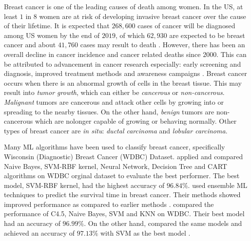 \noindent Breast cancer is one of the leading causes of death among women. In the US, at least $1$ in $8$ women are at risk of developing invasive breast cancer over the cause of their lifetime. It is expected that $268,600$ cases of cancer will be diagnosed among US women by the end of $2019$, of which $62,930$ are expected to be breast cancer and about $41,760$ cases may result to death \citep{uscancer2019}. However, there has been an overall decline in cancer incidence and cancer related deaths since $2000$. This can be attributed to advancement in cancer research especially: early screening and diagnosis, improved treatment methods and awareness campaigns \citep{asri2016using}. Breast cancer occurs when there is an abnormal growth of cells in the breast tissue. This may result into \textit{tumor growth}, which can either be \textit{cancerous} or \textit{non-cancerous}. \textit{Malignant} tumors are cancerous and attack other cells by growing into or spreading to the nearby tissues. On the other hand, \textit{benign} tumors are non-cancerous which are nolonger capable of growing or behaving normally. Other types of breast cancer are \textit{in situ}: \textit{ductal carcinoma} and \textit{lobular carcinoma}.\\

\noindent Many ML algorithms have been used to classify breast cancer, specifically Wisconsin (Diagnostic) Breast Cancer (WDBC) Dataset. \citet{chaurasia2017data} applied and compared Naive Bayes, SVM-RBF kernel, Neural Network, Decision Tree and CART algorithms on WDBC orginal dataset to evaluate the best performer. The best model, SVM-RBF kernel, had the highest accuracy of $96.84\%$. \citet{djebbari2008ensemble} used ensemble ML techniques to predict the survival time in breast cancer. Their methods showed improved performance as compared to earlier methods \citep{asri2016using}. \citet{aruna2011knowledge} compared the performance of C4.5, Naive Bayes, SVM and KNN on WDBC. Their best model had an accuracy of $96.99\%$. On the other hand, \citet{asri2016using} compared the same models and achieved an accuracy of $97.13\%$ with SVM as the best model \citep{asri2016using}.\\


